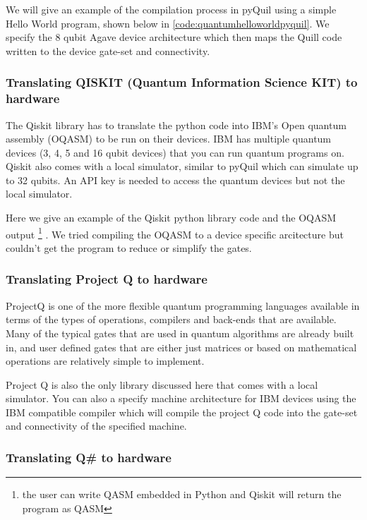 We will give an example of the compilation process in pyQuil using a simple Hello World program, shown below in \autoref{code:quantumhelloworldpyquil}. We specify the 8 qubit Agave device architecture which then maps the Quill code written to the device gate-set and connectivity. 

\subsubsection{Translating QISKIT (Quantum Information Science KIT) to hardware}

The Qiskit library has to translate the python code into IBM's Open quantum assembly (OQASM) to be run on their devices. IBM has multiple quantum devices (3, 4, 5 and 16 qubit devices) that you can run quantum programs on. Qiskit also comes with a local simulator, similar to pyQuil which can simulate up to 32 qubits. An API key is needed to access the quantum devices but not the local simulator.

Here we give an example of the Qiskit python library code and the OQASM output \footnote{the user can write QASM embedded in Python and Qiskit will return the program as QASM \footnotemark} . We tried compiling the OQASM to a device specific arcitecture but couldn't get the program to reduce or simplify the gates.

\subsubsection{Translating Project Q to hardware}

ProjectQ is one of the more flexible quantum programming languages available in terms of the types of operations, compilers and back-ends that are available. Many of the typical gates that are used in quantum algorithms are already built in, and user defined gates that are either just matrices or based on mathematical operations are relatively simple to implement. 

Project Q is also the only library discussed here that comes with a local simulator. You can also a specify machine architecture for IBM devices using the IBM compatible compiler \cite{zulehner2018efficient} which will compile the project Q code into the gate-set and connectivity of the specified machine.
\subsubsection{Translating Q\# to hardware}

